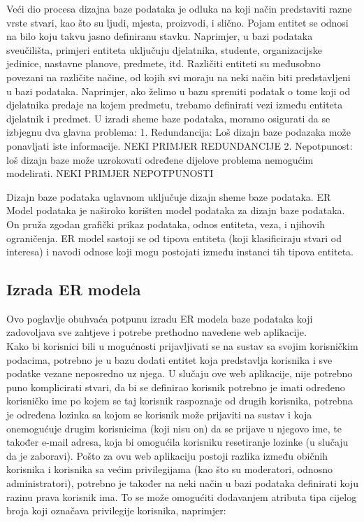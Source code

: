 \documentclass[times, utf8, zavrsni]{fer}
\begin{document}
Veći dio procesa dizajna baze podataka je odluka na koji način predstaviti razne vrste stvari, kao što su ljudi, mjesta, proizvodi, i slično. Pojam entitet se odnosi na bilo koju takvu jasno definiranu stavku. Naprimjer, u bazi podataka sveučilišta, primjeri entiteta uključuju djelatnika, studente, organizacijske jedinice, nastavne planove, predmete, itd. Različiti entiteti su međusobno povezani na različite načine, od kojih svi moraju na neki način biti predstavljeni u bazi podataka. Naprimjer, ako želimo u bazu spremiti podatak o tome koji od djelatnika predaje na kojem predmetu, trebamo definirati vezi između entiteta djelatnik i predmet.
U izradi sheme baze podataka, moramo osigurati da se izbjegnu dva glavna problema:
1. Redundancija: Loš dizajn baze podazaka može ponavljati iste informacije.
NEKI PRIMJER REDUNDANCIJE
2. Nepotpunost: loš dizajn baze može uzrokovati određene dijelove problema nemogućim modelirati.
NEKI PRIMJER NEPOTPUNOSTI

Dizajn baze podataka uglavnom uključuje dizajn sheme baze podataka. ER Model podataka je naširoko korišten model podataka za dizajn baze podataka. On pruža zgodan grafički prikaz podataka, odnos entiteta, veza, i njihovih ograničenja. ER model sastoji se od tipova entiteta (koji klasificiraju stvari od interesa) i navodi odnose koji mogu postojati između instanci tih tipova entiteta.

\subsection{Izrada ER modela}

Ovo poglavlje obuhvaća potpunu izradu ER modela baze podataka koji zadovoljava sve zahtjeve i potrebe prethodno navedene web aplikacije. \\

Kako bi korisnici bili u mogućnosti prijavljivati se na sustav sa svojim korisničkim podacima, potrebno je u bazu dodati entitet koja predstavlja korisnika i sve podatke vezane neposredno uz njega. U slučaju ove web aplikacije, nije potrebno puno komplicirati stvari, da bi se definirao korisnik potrebno je imati određeno korisničko ime po kojem se taj korisnik raspoznaje od drugih korisnika, potrebna je određena lozinka sa kojom se korisnik može prijaviti na sustav i koja onemogućuje drugim korisnicima (koji nisu on) da se prijave u njegovo ime, te također e-mail adresa, koja bi omogućila korisniku resetiranje lozinke (u slučaju da je zaboravi). Pošto za ovu web aplikaciju postoji razlika između običnih korisnika i korisnika sa većim privilegijama (kao što su moderatori, odnosno administratori), potrebno je također na neki način u bazi podataka definirati koju razinu prava korisnik ima. To se može omogućiti dodavanjem atributa tipa cijelog broja koji označava privilegije korisnika, naprimjer:
\end{document}
